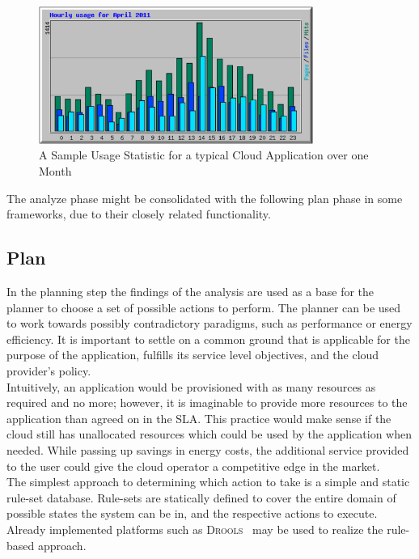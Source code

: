 \documentclass[a4paper]{llncs}
\begin{document}
\begin{figure}[Ht]
	\centering
		\includegraphics[width=0.8\textwidth]{figs/usage.png}
	\caption{A Sample Usage Statistic for a typical Cloud Application over one Month}
	\label{fig:usage}
\end{figure}
 
The analyze phase might be consolidated with the following plan phase in some frameworks, due to their closely related functionality.

\subsection{Plan}
In the planning step the findings of the analysis are used as a base for the planner to choose a set of possible actions to perform. The planner can be used to work towards possibly contradictory paradigms, such as performance or energy efficiency. It is important to settle on a common ground that is applicable for the purpose of the application, fulfills its service level objectives, and the cloud provider’s policy.\\

Intuitively, an application would be provisioned with as many resources as required and no more; however, it is imaginable to provide more resources to the application than agreed on in the SLA. This practice would make sense if the cloud still has unallocated resources which could be used by the application when needed. While passing up savings in energy costs, the additional service provided to the user could give the cloud operator a competitive edge in the market.\\

The simplest approach to determining which action to take is a simple and static rule-set database. Rule-sets are statically defined to cover the entire domain of possible states the system can be in, and the respective actions to execute. Already implemented platforms such as \textsc{Drools}~\cite{Drools} may be used to realize the rule-based approach.\\
\end{document}
